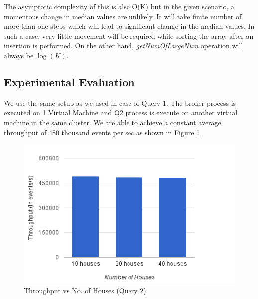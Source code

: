 The asymptotic complexity of this is also O(K) but in the given scenario, a momentous change in median values are unlikely.
It will take finite number of more than one steps which will lead to significant change in the median values.
In such a case, very little movement will be required while sorting the array after an insertion is performed.
On the other hand, \textit{getNumOfLargeNum} operation will always be $\log(K)$.


 
\subsection{Experimental Evaluation}
We use the same setup as we used in case of Query 1.
The broker process is executed on 1 Virtual Machine and Q2 process is execute on another virtual machine in the same cluster.
We are able to achieve a constant average throughput of 480 thousand events per sec as shown in Figure \ref{fig:q2_throughput}

\begin{figure}[h]
\begin{center}
	\includegraphics[scale=0.55]{img/q2_throughput}
	\vspace*{-0.4cm}
	\caption{Throughput vs No.
of Houses (Query 2) \label{fig:q2_throughput}}
\end{center}
\end{figure}

